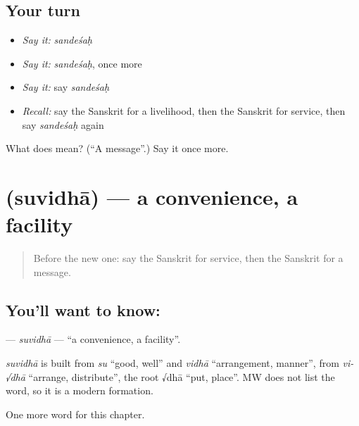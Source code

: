 \subsection*{Your turn}
\begin{itemize}
\raggedright
  \item \emph{Say it:} \emph{sandeśaḥ}
  \item \emph{Say it:} \emph{sandeśaḥ}, once more
  \item \emph{Say it:} say \emph{sandeśaḥ}
  \item \emph{Recall:} say the Sanskrit for a livelihood, then the Sanskrit for service, then say \emph{sandeśaḥ} again
\end{itemize}

\begin{tcolorbox}[breakable,colback=teal!4,colframe=teal!35!black,title={Before you move on}]
What does  mean? (\textquotedblleft{}A message\textquotedblright{}.) Say it once more.
\end{tcolorbox}
\section[\texorpdfstring{\sk{सुविधा} (suvidhā)}{सुविधा (suvidhā)}]{ (suvidhā) — a convenience, a facility}

\label{lesson:SA-C171-suvidha}



\begin{quote}
Before the new one: say the Sanskrit for service, then the Sanskrit for a message.
\end{quote}

\subsection*{You'll want to know: }
\textbf{} — \emph{suvidhā} — \textquotedblleft{}a convenience, a facility\textquotedblright{}.

\begin{cousinweb}
\emph{suvidhā} is built from \emph{su} \textquotedblleft{}good, well\textquotedblright{} and \emph{vidhā} \textquotedblleft{}arrangement, manner\textquotedblright{}, from \emph{vi-√dhā} \textquotedblleft{}arrange, distribute\textquotedblright{}, the root √dhā \textquotedblleft{}put, place\textquotedblright{}. MW does not list the word, so it is a modern formation.
\end{cousinweb}

\begin{grammarlens}[title={What you've built}]
One more word for this chapter.
\end{grammarlens}

